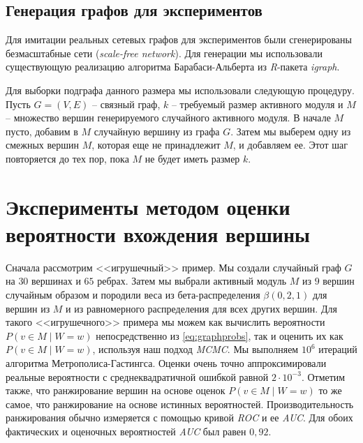 \subsection{Генерация графов для экспериментов}
\label{sec_details}

Для имитации реальных сетевых графов для экспериментов были сгенерированы
безмасштабные сети (\emph{scale-free network}).  Для генерации мы использовали
существующую реализацию алгоритма Барабаси-Альберта из \emph{R}-пакета
\emph{igraph}.

Для выборки подграфа данного размера мы использовали следующую процедуру.
Пусть $G = (V, E)$ -- связный граф, $k$ -- требуемый размер активного модуля
и $M$ -- множество вершин генерируемого случайного активного модуля. В начале
$M$ пусто, добавим в $M$ случайную вершину из графа $G$.  Затем мы выберем
одну из смежных вершин $M$, которая еще не принадлежит $M$, и добавляем ее.
Этот шаг повторяется до тех пор, пока $M$ не будет иметь размер $k$.





\section{Эксперименты методом оценки вероятности вхождения вершины}

Сначала рассмотрим <<игрушечный>> пример. Мы создали случайный граф $G$ на $30$
вершинах и $65$ ребрах.  Затем мы выбрали активный модуль $M$ из $9$ вершин
случайным образом и породили веса из бета-распределения $\beta(0,2, 1)$ для
вершин из $M$ и из равномерного распределения для всех других вершин.  Для
такого <<игрушечного>> примера мы можем как вычислить вероятности $P(v \in
M \mid W=w)$ непосредственно из \eqref{eq:graphprobs}, так и оценить их как
$P(v \in M \mid W=w)$, используя наш подход \emph{MCMC}.  Мы выполняем $10^6$
итераций алгоритма Метрополиса-Гастингса.  Оценки очень точно аппроксимировали
реальные вероятности с среднеквадратичной ошибкой равной $2 \cdot 10^{-3}$.
Отметим также, что ранжирование вершин на основе оценок $P(v \in M \mid W=w)$
то же самое, что ранжирование на основе истинных вероятностей.
Производительность ранжирования обычно измеряется с помощью кривой \emph{ROC}
и ее \emph{AUC}. Для обоих фактических и оценочных вероятностей \emph{AUC} был равен
$0,92$.

